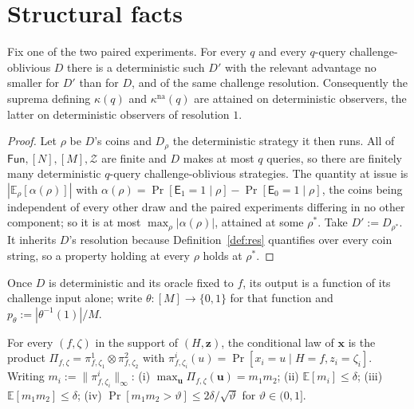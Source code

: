 \documentclass{aicr-solution}
\newcommand{\Fun}{\mathsf{Fun}}
\newcommand{\Prob}[1]{\Pr\!\left[#1\right]}
\newcommand{\Exp}{\mathbb{E}}
\newcommand{\bits}{\{0,1\}}
\newcommand{\vx}{\mathbf{x}}
\newcommand{\vz}{\mathbf{z}}
\newcommand{\vu}{\mathbf{u}}
\newcommand{\kna}{\kappa^{\mathrm{na}}}
\begin{document}
\section{Structural facts}\label{sec:structural}

\begin{lemma}[derandomisation]\label{lem:0}
Fix one of the two paired experiments. For every $q$ and every $q$-query
challenge-oblivious $D$ there is a deterministic such $D'$ with the relevant
advantage no smaller for $D'$ than for $D$, and of the same challenge resolution.
Consequently the suprema defining $\kappa(q)$ and $\kna(q)$ are attained on
deterministic observers, the latter on deterministic observers of resolution $1$.
\end{lemma}

\begin{proof}
Let $\rho$ be $D$'s coins and $D_\rho$ the deterministic strategy it then runs. All
of $\Fun, [N], [M], \mathcal{Z}$ are finite and $D$ makes at most $q$ queries, so
there are finitely many deterministic $q$-query challenge-oblivious strategies. The
quantity at issue is $|\Exp_\rho[\alpha(\rho)]|$ with
$\alpha(\rho) = \Prob{\mathsf{E}_1 = 1 \mid \rho} - \Prob{\mathsf{E}_0 = 1 \mid \rho}$,
the coins being independent of every other draw and the paired experiments
differing in no other component; so it is at most $\max_\rho |\alpha(\rho)|$,
attained at some $\rho^{*}$. Take $D' := D_{\rho^{*}}$. It inherits $D$'s
resolution because Definition~\ref{def:res} quantifies over every coin string, so a
property holding at every $\rho$ holds at $\rho^{*}$.
\end{proof}

Once $D$ is deterministic and its oracle fixed to $f$, its output is a function of
its challenge input alone; write $\theta : [M] \to \bits$ for that function and
$p_\theta := |\theta^{-1}(1)|/M$.

\begin{lemma}\label{lem:1}
For every $(f,\zeta)$ in the support of $(H,\vz)$, the conditional law of $\vx$ is
the product $\Pi_{f,\zeta} = \pi^{1}_{f,\zeta_1} \otimes \pi^{2}_{f,\zeta_2}$ with
$\pi^{i}_{f,\zeta_i}(u) = \Prob{x_i = u \mid H = f, z_i = \zeta_i}$. Writing
$m_i := \|\pi^{i}_{f,\zeta_i}\|_\infty$:
(i) $\max_{\vu} \Pi_{f,\zeta}(\vu) = m_1m_2$;
(ii) $\Exp[m_i] \le \delta$;
(iii) $\Exp[m_1m_2] \le \delta$;
(iv) $\Prob{m_1m_2 > \vartheta} \le 2\delta/\sqrt{\vartheta}$ for
$\vartheta \in (0,1]$.
\end{lemma}
\end{document}
